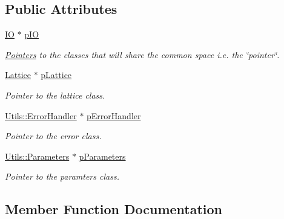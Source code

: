 \subsection*{Public Attributes}
\begin{DoxyCompactItemize}
\item 
\mbox{\hyperlink{classIO}{IO}} $\ast$ \mbox{\hyperlink{classApothesis_a9b445e59759acb31785cec5412ae1fe4}{p\+IO}}
\begin{DoxyCompactList}\small\item\em \mbox{\hyperlink{classPointers}{Pointers}} to the classes that will share the common space i.\+e. the \char`\"{}pointer\char`\"{}. \end{DoxyCompactList}\item 
\mbox{\label{classApothesis_abfdba0ca793f52cbed2b6de31083d3c2}} 
\mbox{\hyperlink{classLattice}{Lattice}} $\ast$ \mbox{\hyperlink{classApothesis_abfdba0ca793f52cbed2b6de31083d3c2}{p\+Lattice}}
\begin{DoxyCompactList}\small\item\em Pointer to the lattice class. \end{DoxyCompactList}\item 
\mbox{\label{classApothesis_a37927f2ba90323bc6da8f3eecee9400e}} 
\mbox{\hyperlink{classUtils_1_1ErrorHandler}{Utils\+::\+Error\+Handler}} $\ast$ \mbox{\hyperlink{classApothesis_a37927f2ba90323bc6da8f3eecee9400e}{p\+Error\+Handler}}
\begin{DoxyCompactList}\small\item\em Pointer to the error class. \end{DoxyCompactList}\item 
\mbox{\label{classApothesis_aef7a188e3e674cc0160e8bd3425ef669}} 
\mbox{\hyperlink{classUtils_1_1Parameters}{Utils\+::\+Parameters}} $\ast$ \mbox{\hyperlink{classApothesis_aef7a188e3e674cc0160e8bd3425ef669}{p\+Parameters}}
\begin{DoxyCompactList}\small\item\em Pointer to the paramters class. \end{DoxyCompactList}\end{DoxyCompactItemize}


\subsection{Member Function Documentation}
\mbox{\label{classApothesis_a423ade721d6955058ceca935908bada0}} 
